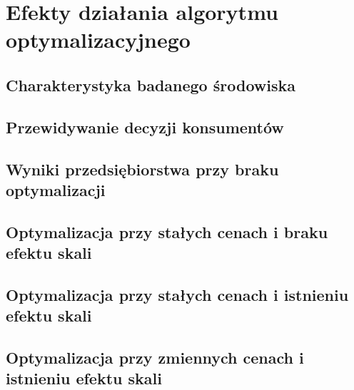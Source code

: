 \documentclass{article}
\begin{document}
\newpage
\section{Efekty działania algorytmu optymalizacyjnego}
\subsection{Charakterystyka badanego środowiska}
\subsection{Przewidywanie decyzji konsumentów}
\subsection{Wyniki przedsiębiorstwa przy braku optymalizacji}
\subsection{Optymalizacja przy stałych cenach i braku efektu skali}
\subsection{Optymalizacja przy stałych cenach i istnieniu efektu skali}
\subsection{Optymalizacja przy zmiennych cenach i istnieniu efektu skali}



\end{document}
